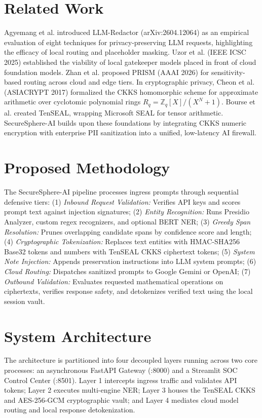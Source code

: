 \documentclass[10pt,a4paper]{article}
\begin{document}
\section{Related Work}
Agyemang et al. introduced LLM-Redactor (arXiv:2604.12064) as an empirical evaluation of eight techniques for privacy-preserving LLM requests, highlighting the efficacy of local routing and placeholder masking. Uzor et al. (IEEE ICSC 2025) established the viability of local gatekeeper models placed in front of cloud foundation models. Zhan et al. proposed PRISM (AAAI 2026) for sensitivity-based routing across cloud and edge tiers. In cryptographic privacy, Cheon et al. (ASIACRYPT 2017) formalized the CKKS homomorphic scheme for approximate arithmetic over cyclotomic polynomial rings $R_q = \mathbb{Z}_q[X]/(X^N+1)$. Bourse et al. created TenSEAL, wrapping Microsoft SEAL for tensor arithmetic. SecureSphere-AI builds upon these foundations by integrating CKKS numeric encryption with enterprise PII sanitization into a unified, low-latency AI firewall.

\section{Proposed Methodology}
The SecureSphere-AI pipeline processes ingress prompts through sequential defensive tiers: (1) \emph{Inbound Request Validation:} Verifies API keys and scores prompt text against injection signatures; (2) \emph{Entity Recognition:} Runs Presidio Analyzer, custom regex recognizers, and optional BERT NER; (3) \emph{Greedy Span Resolution:} Prunes overlapping candidate spans by confidence score and length; (4) \emph{Cryptographic Tokenization:} Replaces text entities with HMAC-SHA256 Base32 tokens and numbers with TenSEAL CKKS ciphertext tokens; (5) \emph{System Note Injection:} Appends preservation instructions into LLM system prompts; (6) \emph{Cloud Routing:} Dispatches sanitized prompts to Google Gemini or OpenAI; (7) \emph{Outbound Validation:} Evaluates requested mathematical operations on ciphertexts, verifies response safety, and detokenizes verified text using the local session vault.

\section{System Architecture}
The architecture is partitioned into four decoupled layers running across two core processes: an asynchronous FastAPI Gateway (:8000) and a Streamlit SOC Control Center (:8501). Layer 1 intercepts ingress traffic and validates API tokens; Layer 2 executes multi-engine NER; Layer 3 houses the TenSEAL CKKS and AES-256-GCM cryptographic vault; and Layer 4 mediates cloud model routing and local response detokenization.
\end{document}

